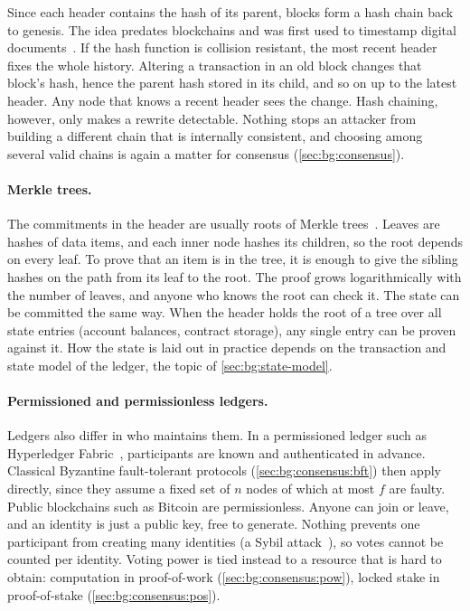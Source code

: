 Since each header contains the hash of its parent, blocks form a hash chain back to genesis.
The idea predates blockchains and was first used to timestamp digital documents~\cite{haber1991timestamp}.
If the hash function is collision resistant, the most recent header fixes the whole history.
Altering a transaction in an old block changes that block's hash, hence the parent hash stored in its child, and so on up to the latest header.
Any node that knows a recent header sees the change.
Hash chaining, however, only makes a rewrite detectable.
Nothing stops an attacker from building a different chain that is internally consistent, and choosing among several valid chains is again a matter for consensus (\autoref{sec:bg:consensus}).

\paragraph{Merkle trees.}
The commitments in the header are usually roots of Merkle trees~\cite{merkle1987digital}.
Leaves are hashes of data items, and each inner node hashes its children, so the root depends on every leaf.
To prove that an item is in the tree, it is enough to give the sibling hashes on the path from its leaf to the root.
The proof grows logarithmically with the number of leaves, and anyone who knows the root can check it.
The state can be committed the same way.
When the header holds the root of a tree over all state entries (account balances, contract storage), any single entry can be proven against it.
How the state is laid out in practice depends on the transaction and state model of the ledger, the topic of \autoref{sec:bg:state-model}.

\paragraph{Permissioned and permissionless ledgers.}
Ledgers also differ in who maintains them.
In a permissioned ledger such as Hyperledger Fabric~\cite{androulaki2018hyperledger}, participants are known and authenticated in advance.
Classical Byzantine fault-tolerant protocols (\autoref{sec:bg:consensus:bft}) then apply directly, since they assume a fixed set of $n$ nodes of which at most $f$ are faulty.
Public blockchains such as Bitcoin are permissionless.
Anyone can join or leave, and an identity is just a public key, free to generate.
Nothing prevents one participant from creating many identities (a Sybil attack~\cite{douceur2002sybil}), so votes cannot be counted per identity.
Voting power is tied instead to a resource that is hard to obtain: computation in proof-of-work (\autoref{sec:bg:consensus:pow}), locked stake in proof-of-stake (\autoref{sec:bg:consensus:pos}).

